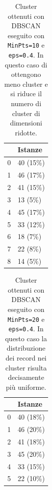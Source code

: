 \documentclass[12pt]{article}
\begin{document}
\begin{table}[H]
\centering
\begin{tabular}{@{}ll@{}}
\toprule
                        & Istanze    \\ \midrule
\multicolumn{1}{l}{0}   & 40 (15\%)  \\ 
\multicolumn{1}{l}{1}   & 46 (17\%)  \\ 
\multicolumn{1}{l}{2}   & 41 (15\%)  \\ 
\multicolumn{1}{l}{3}   & 13 (5\%)   \\ 
\multicolumn{1}{l}{4}   & 45 (17\%)  \\ 
\multicolumn{1}{l}{5}   & 33 (12\%)  \\ 
\multicolumn{1}{l}{6}   & 18 (7\%)   \\ 
\multicolumn{1}{l}{7}   & 22 (8\%)   \\ 
\multicolumn{1}{l}{8}   & 14 (5\%)   \\ \bottomrule
\end{tabular}
\caption{Cluster ottenuti con DBSCAN eseguito con \texttt{MinPts=10} e \texttt{eps=0.4}. In questo caso di ottengono meno cluster e si riduce il numero di cluster di dimensioni ridotte.}
\label{tab:dbscan1004}
\end{table}
\begin{table}[H]
\centering
\begin{tabular}{@{}ll@{}}
\toprule
                        & Istanze  \\ \midrule
\multicolumn{1}{l}{0} & 40 (18\%) \\
\multicolumn{1}{l}{1} & 46 (20\%) \\
\multicolumn{1}{l}{2} & 41 (18\%) \\
\multicolumn{1}{l}{3} & 45 (20\%) \\
\multicolumn{1}{l}{4} & 33 (15\%) \\
\multicolumn{1}{l}{5} & 22 (10\%) \\ \bottomrule
\end{tabular}
\caption{Cluster ottenuti con DBSCAN eseguito con \texttt{MinPts=20} e \texttt{eps=0.4}. In questo caso la distribuzione dei record nei cluster risulta decisamente più uniforme.}
\label{tab:dbscan2004}
\end{table}
\end{document}
